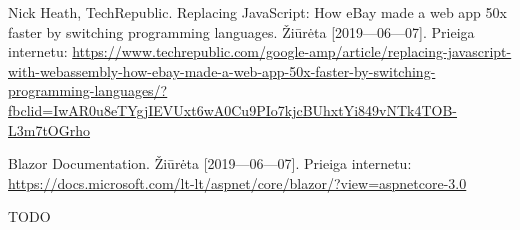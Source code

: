 \documentclass{VUMIFPSkursinis}
\begin{document}
\begin{thebibliography}{99}
Nick Heath, TechRepublic. Replacing JavaScript: How eBay made a web app 50x faster by switching programming languages. Žiūrėta [2019—06—07].  Prieiga internetu: \url{https://www.techrepublic.com/google-amp/article/replacing-javascript-with-webassembly-how-ebay-made-a-web-app-50x-faster-by-switching-programming-languages/?fbclid=IwAR0u8eTYgjIEVUxt6wA0Cu9PIo7kjcBUhxtYi849vNTk4TOB-L3m7tOGrho}

Blazor Documentation. Žiūrėta [2019—06—07].  Prieiga internetu: \url{https://docs.microsoft.com/lt-lt/aspnet/core/blazor/?view=aspnetcore-3.0}

\end{thebibliography}

TODO
\end{document}

